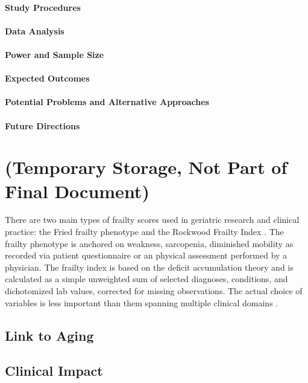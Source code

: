 \paragraph{Study Procedures}\label{study-procedures}


\paragraph{Data Analysis}\label{data-analysis}

\paragraph{Power and Sample Size}\label{power-and-sample-size}

\paragraph{Expected Outcomes}\label{expected-outcomes}

\paragraph{Potential Problems and Alternative
      Approaches}\label{potential-problems-and-alternative-approaches}

\paragraph{Future Directions}\label{future-directions} 
    
\section{(Temporary Storage, Not Part of Final Document)}\label{ammo}
There are two main types of frailty scores used in geriatric research and clinical practice: the Fried frailty phenotype \cite{Fried_2001} and the Rockwood Frailty Index \cite{Mitnitski_2001}. The frailty phenotype is anchored on weakness, sarcopenia, diminished mobility as recorded via patient questionnaire or an physical assessment performed by a physician. The frailty index is based on the deficit accumulation theory and is calculated as a simple unweighted sum of selected diagnoses, conditions, and dichotomized lab values, corrected for missing observations. The actual choice of variables is less important than them spanning multiple clinical domains \cite{Searle_2008}. 

\subsection{Link to Aging}\label{link-to-aging}

\subsection{Clinical Impact}\label{clinical-impact}


